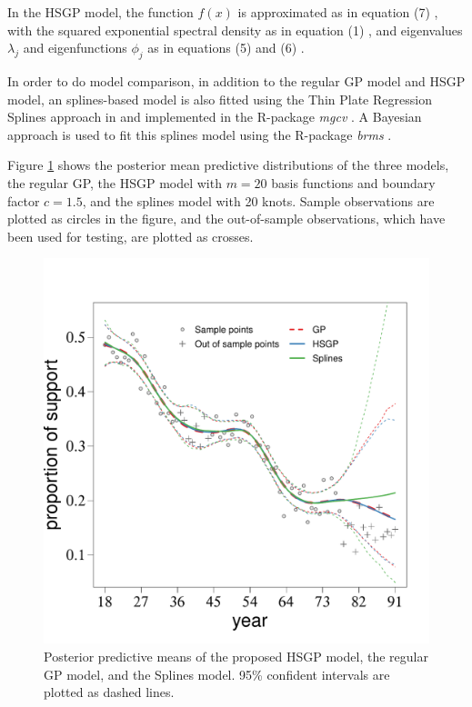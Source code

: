 \documentclass[onecolumn,a4paper,11pt]{article}
\begin{document}
In the HSGP model, the function $f(x)$ is approximated as in equation (7)%
, with the squared exponential spectral density as in equation (1)%
, and eigenvalues $\lambda_j$  and eigenfunctions $\phi_j$ as in equations (5) %
and (6)%
. 

In order to do model comparison, in addition to the regular GP model and HSGP model, an splines-based model is also fitted using the Thin Plate Regression Splines approach in \cite{wood2003thin} and implemented in the R-package \textit{mgcv} \citep{wood2011mgcv}. A Bayesian approach is used to fit this splines model using the R-package \textit{brms} \citep{burkner2017brms}.

Figure \ref{ch5_fig12_Posteriors_gaydata} shows the posterior mean predictive distributions of the three models, the regular GP, the HSGP model with $m=20$ basis functions and boundary factor $c=1.5$, and the splines model with 20 knots. Sample observations are plotted as circles in the figure, and the out-of-sample observations, which have been used for testing, are plotted as crosses.

\begin{figure}
\centering
\includegraphics[scale=0.50]{ch5_fig12_Posteriors_gaydata.pdf}
\caption{Posterior predictive means of the proposed HSGP model, the regular GP model, and the Splines model. 95\% confident intervals are plotted as dashed lines.}
  \label{ch5_fig12_Posteriors_gaydata}
\end{figure}
\end{document}
